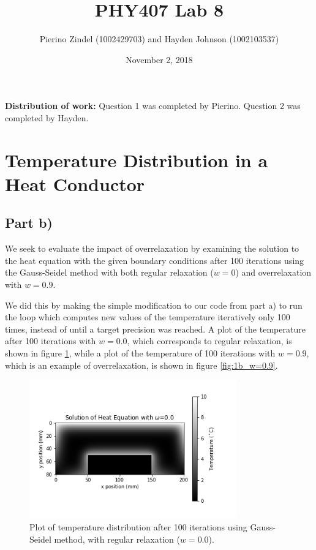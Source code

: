 \documentclass{article}
\title{PHY407 Lab 8}
\author{Pierino Zindel (1002429703) and Hayden Johnson (1002103537)}
\date{November 2, 2018}
\begin{document}
\maketitle

\noindent \textbf{Distribution of work:} Question 1 was completed by Pierino. Question 2 was completed by Hayden.

\section{Temperature Distribution in a Heat Conductor}

\subsection{Part b)}

We seek to evaluate the impact of overrelaxation by examining the solution to the heat equation with the given boundary conditions after 100 iterations using the Gauss-Seidel method with both regular relaxation ($w=0$) and overrelaxation with $w=0.9$. 

We did this by making the simple modification to our code from part a) to run the loop which computes new values of the temperature iteratively only 100 times, instead of until a target precision was reached. A plot of the temperature after 100 iterations with $w=0.0$, which corresponds to regular relaxation, is shown in figure \ref{fig:1b_w=0.0}, while a plot of the temperature of 100 iterations with $w=0.9$, which is an example of overrelaxation, is shown in figure \ref{fig:1b_w=0.9}. 

\begin{figure}[H]
	\centering
	\includegraphics[width=0.8\textwidth]{../images/q1_b_0p0.png}
	\caption{Plot of temperature distribution after 100 iterations using Gauss-Seidel method, with regular relaxation ($w=0.0$).}
	\label{fig:1b_w=0.0}
\end{figure}
\end{document}
